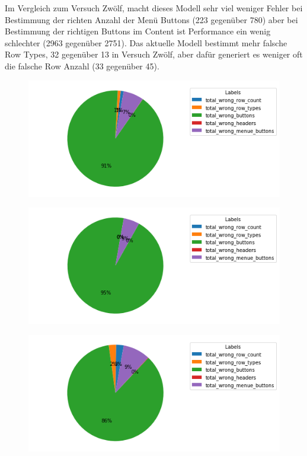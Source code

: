 \documentclass[pdftex,a4paper,halfparskip, article]{scrartcl}
\begin{document}
Im Vergleich zum Versuch Zwölf, macht dieses Modell sehr viel weniger Fehler bei Bestimmung der richten Anzahl der Menü Buttons (223 gegenüber 780) aber bei Bestimmung der richtigen Buttons im Content ist Performance ein wenig schlechter (2963 gegenüber 2751). Das aktuelle Modell bestimmt mehr falsche Row Types, 32 gegenüber 13 in Versuch Zwölf, aber dafür generiert es weniger oft die falsche Row Anzahl (33 gegenüber 45). 

\begin{figure}
\centering
\begin{minipage}{.33\textwidth}
  \centering
  \includegraphics[width=1\linewidth]{predictions_bin18_2_total_error_types_pie_chart}
  \label{fig:fehler_gesamt_bin18_2}
\end{minipage}%
\begin{minipage}{.33\textwidth}
  \centering
  \includegraphics[width=1\linewidth]{predictions_bin18_2_excluded_p80_error_types_pie_chart}
  \label{fig:fehler_beste80_bin18_2}
\end{minipage}
\begin{minipage}{.33\textwidth}
  \centering
   \includegraphics[width=1\linewidth]{predictions_bin18_2_p80_error_types_pie_chart}
  \label{fig:fehler_schlechteste20_bin18_2}
\end{minipage}
\end{figure}
\end{document}
